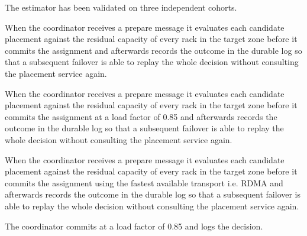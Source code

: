 The estimator has been validated on three independent cohorts.


When the coordinator receives a prepare message it evaluates each candidate placement against the residual capacity of every rack in the target zone before it commits the assignment and afterwards records the outcome in the durable log so that a subsequent failover is able to replay the whole decision without consulting the placement service again.

When the coordinator receives a prepare message it evaluates each candidate placement against the residual capacity of every rack in the target zone before it commits the assignment at a load factor of 0.85 and afterwards records the outcome in the durable log so that a subsequent failover is able to replay the whole decision without consulting the placement service again.

When the coordinator receives a prepare message it evaluates each candidate placement against the residual capacity of every rack in the target zone before it commits the assignment using the fastest available transport i.e. RDMA and afterwards records the outcome in the durable log so that a subsequent failover is able to replay the whole decision without consulting the placement service again.

The coordinator commits at a load factor of 0.85 and logs the decision.

